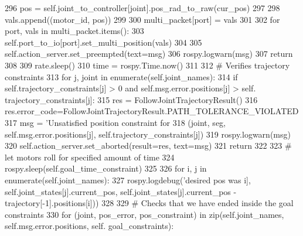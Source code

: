 \begin{DoxyCode}
{{{{{{{296                             pos = self.joint\_to\_controller[joint].pos\_rad\_to\_raw(cur\_pos)
297                             
298                             vals.append((motor\_id, pos))
299                             
300                         multi\_packet[port] = vals
301                         
302                     \textcolor{keywordflow}{for} port, vals \textcolor{keywordflow}{in} multi\_packet.items():
303                         self.port\_to\_io[port].set\_multi\_position(vals)
304                         
305                     self.action\_server.set\_preempted(text=msg)
306                     rospy.logwarn(msg)
307                     \textcolor{keywordflow}{return}
308                     
309                 rate.sleep()
310                 time = rospy.Time.now()
311                 
312             \textcolor{comment}{# Verifies trajectory constraints}
313             \textcolor{keywordflow}{for} j, joint \textcolor{keywordflow}{in} enumerate(self.joint\_names):
314                 \textcolor{keywordflow}{if} self.trajectory\_constraints[j] > 0 \textcolor{keywordflow}{and} self.msg.error.positions[j] > self.
      trajectory\_constraints[j]:
315                     res = FollowJointTrajectoryResult()
316                     res.error\_code=FollowJointTrajectoryResult.PATH\_TOLERANCE\_VIOLATED
317                     msg = \textcolor{stringliteral}{'Unsatisfied position constraint for %
318                            (joint, seg, self.msg.error.positions[j], self.trajectory\_constraints[j])
319                     rospy.logwarn(msg)
320                     self.action\_server.set\_aborted(result=res, text=msg)
321                     \textcolor{keywordflow}{return}
322                     
323         \textcolor{comment}{# let motors roll for specified amount of time}
324         rospy.sleep(self.goal\_time\_constraint)
325         
326         \textcolor{keywordflow}{for} i, j \textcolor{keywordflow}{in} enumerate(self.joint\_names):
327             rospy.logdebug(\textcolor{stringliteral}{'desired pos was %
      i], self.joint\_states[j].current\_pos, self.joint\_states[j].current\_pos - trajectory[-1].positions[i]))
328             
329         \textcolor{comment}{# Checks that we have ended inside the goal constraints}
330         \textcolor{keywordflow}{for} (joint, pos\_error, pos\_constraint) \textcolor{keywordflow}{in} zip(self.joint\_names, self.msg.error.positions, self.
      goal\_constraints):
}}}}}}}}}
\end{DoxyCode}
